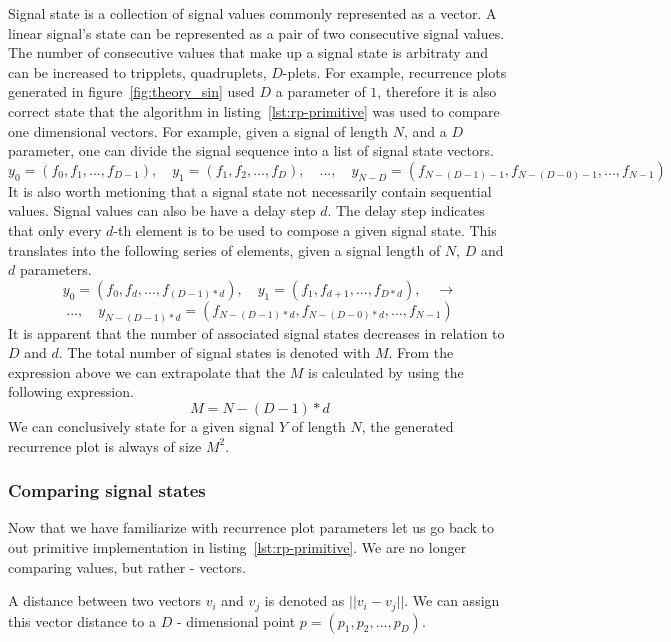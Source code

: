 \documentclass[a4paper,12pt,fleqn]{article}
\begin{document}
Signal state is a collection of signal values commonly represented as a vector.
A linear signal's state can be represented as a pair of two consecutive signal values.
The number of consecutive values that make up a signal state is arbitraty and can be increased to tripplets, quadruplets, $D$-plets.
For example, recurrence plots generated in figure~\ref{fig:theory_sin} used $D$ a parameter of $1$, therefore it is also correct state that the algorithm in listing~\ref{lst:rp-primitive} was used to compare one dimensional vectors.
For example, given a signal of length ${N}$, and a $D$ parameter, one can divide the signal sequence into a list of signal state vectors.
\[
  y_0=(f_0,f_1,...,f_{D-1}) ,\quad y_1=(f_1,f_2,...,f_{D}) ,\quad ...,\quad y_{N-D}=
  (f_{N-(D-1)-1},f_{N-(D-0)-1},...,f_{N-1})
\]
It is also worth metioning that a signal state not necessarily contain sequential values.
Signal values can also be have a delay step $d$.
The delay step indicates that only every $d$-th element is to be used to compose a given signal state.
This translates into the following series of elements, given a signal length of $N$, $D$ and $d$ parameters.
\[
  y_0=(f_0,f_{d},...,f_{(D-1)*d}) ,\quad y_1=(f_1,f_{d+1},...,f_{D*d}) , \quad \longrightarrow
\]
\[
  ...,\quad y_{N-(D-1)*d}=(f_{N-(D-1)*d},f_{N-(D-0)*d},...,f_{N-1})  
\]
It is apparent that the number of associated signal states decreases in relation to $D$ and $d$. 
The total number of signal states is denoted with $M$.
From the expression above we can extrapolate that the $M$ is calculated by using the following expression.
\[
  M = N-(D-1)*d
\]
We can conclusively state for a given signal $Y$ of length $N$, the generated recurrence plot is always of size $M^2$.

\subsubsection{Comparing signal states}
Now that we have familiarize with recurrence plot parameters let us go back to out primitive implementation in listing~\ref{lst:rp-primitive}.
We are no longer comparing values, but rather - vectors.

A distance between two vectors $v_i$ and $v_j$ is denoted as $||v_i - v_j||$.
We can assign this vector distance to a $D$ - dimensional point $p = (p_1, p_2, ..., p_D)$.
\end{document}
